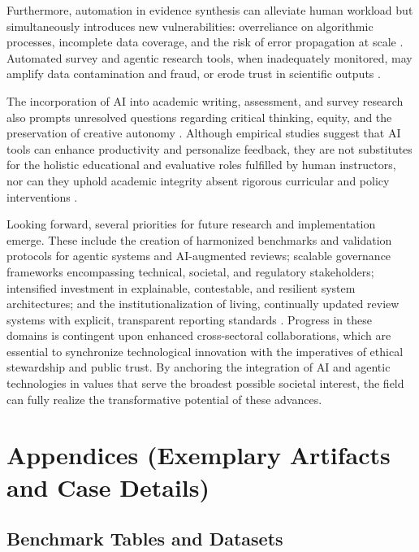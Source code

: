 \documentclass[sigconf]{acmart}
\begin{document}
Furthermore, automation in evidence synthesis can alleviate human workload but simultaneously introduces new vulnerabilities: overreliance on algorithmic processes, incomplete data coverage, and the risk of error propagation at scale \cite{ref74,ref80,ref84,ref102,ref104}. Automated survey and agentic research tools, when inadequately monitored, may amplify data contamination and fraud, or erode trust in scientific outputs \cite{ref89,ref90,ref91,ref92,ref93,ref94,ref95,ref96,ref97,ref98,ref100,ref101,ref105,ref106,ref113,ref114,ref115}.

The incorporation of AI into academic writing, assessment, and survey research also prompts unresolved questions regarding critical thinking, equity, and the preservation of creative autonomy \cite{ref86,ref87,ref88,ref89,ref90,ref91,ref92,ref93,ref94,ref101,ref114,ref115,ref117}. Although empirical studies suggest that AI tools can enhance productivity and personalize feedback, they are not substitutes for the holistic educational and evaluative roles fulfilled by human instructors, nor can they uphold academic integrity absent rigorous curricular and policy interventions \cite{ref87,ref89,ref92,ref94,ref114,ref115,ref117}.

Looking forward, several priorities for future research and implementation emerge. These include the creation of harmonized benchmarks and validation protocols for agentic systems and AI-augmented reviews; scalable governance frameworks encompassing technical, societal, and regulatory stakeholders; intensified investment in explainable, contestable, and resilient system architectures; and the institutionalization of living, continually updated review systems with explicit, transparent reporting standards \cite{ref74,ref75,ref80,ref84,ref95,ref97,ref98,ref100,ref102,ref104,ref106,ref109,ref110,ref113,ref114}. Progress in these domains is contingent upon enhanced cross-sectoral collaborations, which are essential to synchronize technological innovation with the imperatives of ethical stewardship and public trust. By anchoring the integration of AI and agentic technologies in values that serve the broadest possible societal interest, the field can fully realize the transformative potential of these advances.

\section{Appendices (Exemplary Artifacts and Case Details)}

\subsection{Benchmark Tables and Datasets}
\end{document}
